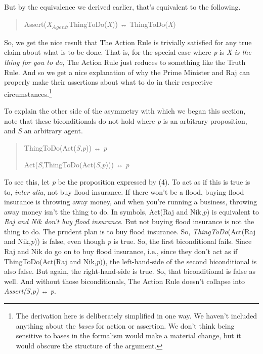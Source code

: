 \documentclass[
  11pt,
  letterpaper,
  DIV=11,
  numbers=noendperiod,
  twoside]{scrartcl}
\begin{document}
But by the equivalence we derived earlier, that's equivalent to the
following.

\begin{quote}
Assert(\emph{X\textsubscript{Agent},}ThingToDo(\emph{X})) ↔
ThingToDo(\emph{X})
\end{quote}

So, we get the nice result that The Action Rule is trivially satisfied
for any true claim about what is to be done. That is, for the special
case where \emph{p} is \emph{X is the thing for you to do}, The Action
Rule just reduces to something like the Truth Rule. And so we get a nice
explanation of why the Prime Minister and Raj can properly make their
assertions about what to do in their respective
circumstances.\footnote{The derivation here is deliberately simplified
  in one way. We haven't included anything about the \emph{bases} for
  action or assertion. We don't think being sensitive to bases in the
  formalism would make a material change, but it would obscure the
  structure of the argument.}

To explain the other side of the asymmetry with which we began this
section, note that these biconditionals do not hold where \emph{p} is an
arbitrary proposition, and \emph{S} an arbitrary agent.

\begin{quote}
ThingToDo(Act(\emph{S,p})) ↔ \emph{p}

Act(\emph{S},ThingToDo(Act(\emph{S},\emph{p}))) ↔ \emph{p}
\end{quote}

To see this, let \emph{p} be the proposition expressed by (4). To act as
if this is true is to, \emph{inter alia}, not buy flood insurance. If
there won't be a flood, buying flood insurance is throwing away money,
and when you're running a business, throwing away money isn't the thing
to do. In symbols, Act(Raj and Nik,\emph{p}) is equivalent to \emph{Raj
and Nik don't buy flood insurance}. But not buying flood insurance is
not the thing to do. The prudent plan is to buy flood insurance. So,
\emph{ThingToDo}(Act(Raj and Nik,\emph{p})) is false, even though
\emph{p} is true. So, the first biconditional fails. Since Raj and Nik
do go on to buy flood insurance, i.e., since they don't act as if
ThingToDo(Act(Raj and Nik,\emph{p})), the left-hand-side of the second
biconditional is also false. But again, the right-hand-side is true. So,
that biconditional is false as well. And without those biconditionals,
The Action Rule doesn't collapse into \emph{Assert(S},\emph{p)} ↔
\emph{p}.
\end{document}
